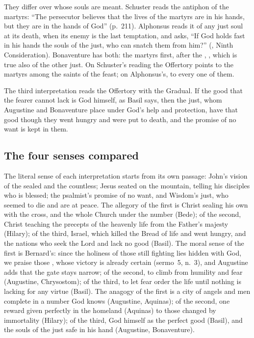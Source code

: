 They differ over whose souls are meant. Schuster reads the antiphon of the
martyrs: ``The persecutor believes that the lives of the martyrs are in his
hands, but they are in the hands of God'' (p.~211). Alphonsus reads it of
any just soul at its death, when its enemy is the last temptation, and asks, ``If God holds fast in his hands the souls of the just, who can
snatch them from him?'' (, Ninth Consideration).
Bonaventure has both: the martyrs first, after the , , which is true also of the other just. On
Schuster's reading the Offertory points to the martyrs among the saints of
the feast; on Alphonsus's, to every one of them.

The third interpretation reads the Offertory with the Gradual. If the good
that the fearer cannot lack is God himself, as Basil says, then the just,
whom Augustine and Bonaventure place under God's help and protection, have
that good though they went hungry and were put to death, and the promise of
no want is kept in them.

\subsection{The four senses compared}

The literal sense of each interpretation starts from its own passage: John's
vision of the sealed and the countless; Jesus seated on the mountain, telling
his disciples who is blessed; the psalmist's promise of no want, and Wisdom's
just, who seemed to die and are at peace. The allegory of the first is Christ
sealing his own with the cross, and the whole Church under the number (Bede);
of the second, Christ teaching the precepts of the heavenly life from the
Father's majesty (Hilary); of the third, Israel, which killed the Bread of
life and went hungry, and the nations who seek the Lord and lack no good
(Basil). The moral sense of the first is Bernard's: since the holiness of
those still fighting lies hidden with God, we praise those , whose victory is already certain (sermo~5, n.~3), and
Augustine adds that the gate stays narrow; of the second, to climb from
humility and fear (Augustine, Chrysostom); of the third, to let fear order
the life until nothing is lacking for any virtue (Basil). The anagogy of the
first is a city of angels and men complete in a number God knows (Augustine,
Aquinas); of the second, one reward given perfectly in the homeland (Aquinas) to those changed
by immortality (Hilary); of the third, God himself as the perfect good
(Basil), and the souls of the just safe in his hand (Augustine,
Bonaventure).
